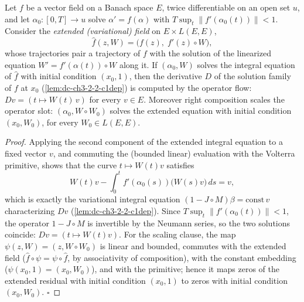 \begin{lemma}
  \label{lem:dc-ch3-2-2-variational}
  \leanok
  Let $f$ be a vector field on a Banach space $E$, twice differentiable on an
  open set $u$, and let $\alpha_0 : [0,T] \to u$ solve $\alpha' = f(\alpha)$
  with $T \sup_t \|f'(\alpha_0(t))\| < 1$. Consider the \emph{extended
  (variational) field} on $E \times L(E,E)$,
  $$\hat f(z, W) = \big(f(z),\; f'(z) \circ W\big),$$
  whose trajectories pair a trajectory of $f$ with the solution of the
  linearized equation $W' = f'(\alpha(t)) \circ W$ along it. If $(\alpha_0, W)$
  solves the integral equation of $\hat f$ with initial condition $(x_0, 1)$,
  then the derivative $D$ of the solution family of $f$ at $x_0$
  (\cref{lem:dc-ch3-2-2-c1dep}) is computed by the operator flow:
  $Dv = (t \mapsto W(t)\,v)$ for every $v \in E$. Moreover right composition
  scales the operator slot: $(\alpha_0, W \circ W_0)$ solves the extended
  equation with initial condition $(x_0, W_0)$, for every $W_0 \in L(E,E)$.
\end{lemma}
\begin{proof}
  \leanok
  Applying the second component of the extended integral equation to a fixed
  vector $v$, and commuting the (bounded linear) evaluation with the Volterra
  primitive, shows that the curve $t \mapsto W(t)v$ satisfies
  $$W(t)v - \int_0^t f'(\alpha_0(s))\big(W(s)v\big)\,ds = v ,$$
  which is exactly the variational integral equation
  $(1 - J \circ M)\beta = \mathrm{const}\, v$ characterizing $Dv$
  (\cref{lem:dc-ch3-2-2-c1dep}). Since $T \sup_t \|f'(\alpha_0(t))\| < 1$, the
  operator $1 - J \circ M$ is invertible by the Neumann series, so the two
  solutions coincide: $Dv = (t \mapsto W(t)v)$. For the scaling clause, the map
  $\psi(z, W) = (z, W \circ W_0)$ is linear and bounded, commutes with the
  extended field ($\hat f \circ \psi = \psi \circ \hat f$, by associativity of
  composition), with the constant embedding ($\psi(x_0, 1) = (x_0, W_0)$), and
  with the primitive; hence it maps zeros of the extended residual with initial
  condition $(x_0, 1)$ to zeros with initial condition $(x_0, W_0)$. $\square$
\end{proof}

